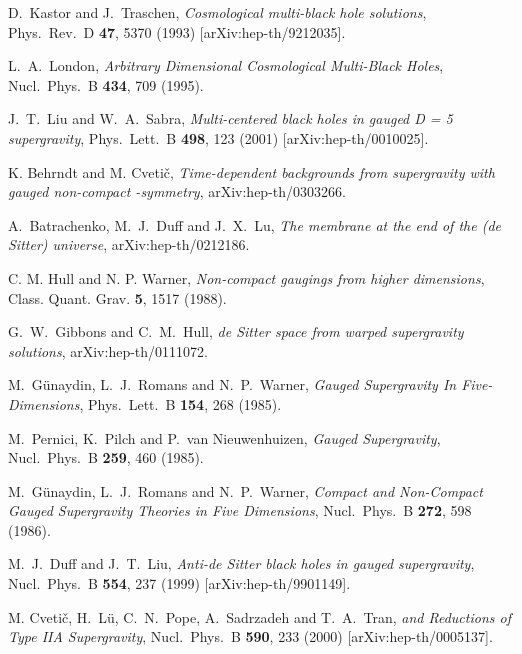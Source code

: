 \documentclass[a4paper,12pt]{article}
\begin{document}
\begin{thebibliography}{99}
D.~Kastor and J.~Traschen,
{\sl Cosmological multi-black hole solutions},
Phys.\ Rev.\ D {\bf 47}, 5370 (1993) [arXiv:hep-th/9212035].

L.~A.~London,
{\sl Arbitrary Dimensional Cosmological Multi-Black Holes},
Nucl.\ Phys.\ B {\bf 434}, 709 (1995).

J.~T.~Liu and W.~A.~Sabra,
{\sl Multi-centered black holes in gauged D = 5 supergravity},
Phys.\ Lett.\ B {\bf 498}, 123 (2001) [arXiv:hep-th/0010025].

K. Behrndt and M. Cveti\v{c},
{\sl Time-dependent backgrounds from supergravity with gauged non-compact
\coordHE{}-symmetry},
arXiv:hep-th/0303266.

A.~Batrachenko, M.~J.~Duff and J.~X.~Lu,
{\sl The membrane at the end of the (de Sitter) universe},
arXiv:hep-th/0212186.

C. M. Hull and N. P. Warner,
{\sl Non-compact gaugings from higher dimensions},
Class. Quant. Grav. {\bf 5}, 1517 (1988).

G.~W.~Gibbons and C.~M.~Hull,
{\sl de Sitter space from warped supergravity solutions},
arXiv:hep-th/0111072.

M.~G\"unaydin, L.~J.~Romans and N.~P.~Warner,
{\sl Gauged \coordHE{} Supergravity In Five-Dimensions},
Phys.\ Lett.\ B {\bf 154}, 268 (1985).

M.~Pernici, K.~Pilch and P.~van Nieuwenhuizen,
{\sl Gauged \coordHE{}  \coordHE{} Supergravity},
Nucl.\ Phys.\ B {\bf 259}, 460 (1985).

M.~G\"{u}naydin, L.~J.~Romans and N.~P.~Warner,
{\sl Compact and Non-Compact Gauged Supergravity Theories in Five Dimensions},
Nucl.\ Phys.\ B {\bf 272}, 598 (1986).

M.~J.~Duff and J.~T.~Liu,
{\sl Anti-de Sitter black holes in gauged \coordHE{} supergravity},
Nucl.\ Phys.\ B {\bf 554}, 237 (1999) [arXiv:hep-th/9901149].

M. Cveti\v{c}, H.~L\"u, C.~N.~Pope, A.~Sadrzadeh and T.~A.~Tran, 
{\sl {}\coordHE{} and \coordHE{} Reductions of Type IIA Supergravity}, 
Nucl.\ Phys.\ B {\bf 590}, 233 (2000) [arXiv:hep-th/0005137].

\end{thebibliography}
\end{document}
